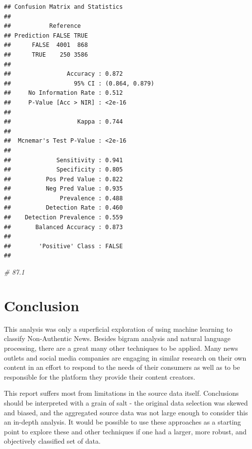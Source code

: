 \documentclass[
]{article}
\newenvironment{Shaded}{\begin{snugshade}}{\end{snugshade}}
\newcommand{\CommentTok}[1]{\textcolor[rgb]{0.56,0.35,0.01}{\textit{#1}}}
\begin{document}
\begin{verbatim}
## Confusion Matrix and Statistics
## 
##           Reference
## Prediction FALSE TRUE
##      FALSE  4001  868
##      TRUE    250 3586
##                                         
##                Accuracy : 0.872         
##                  95% CI : (0.864, 0.879)
##     No Information Rate : 0.512         
##     P-Value [Acc > NIR] : <2e-16        
##                                         
##                   Kappa : 0.744         
##                                         
##  Mcnemar's Test P-Value : <2e-16        
##                                         
##             Sensitivity : 0.941         
##             Specificity : 0.805         
##          Pos Pred Value : 0.822         
##          Neg Pred Value : 0.935         
##              Prevalence : 0.488         
##          Detection Rate : 0.460         
##    Detection Prevalence : 0.559         
##       Balanced Accuracy : 0.873         
##                                         
##        'Positive' Class : FALSE         
## 
\end{verbatim}

\begin{Shaded}
\begin{Highlighting}[]
\CommentTok{\#  87.1}
\end{Highlighting}
\end{Shaded}

\pagebreak

\hypertarget{conclusion}{%
\section{Conclusion}\label{conclusion}}

This analysis was only a superficial exploration of using machine
learning to classify Non-Authentic News. Besides bigram analysis and
natural language processing, there are a great many other techniques to
be applied. Many news outlets and social media companies are engaging in
similar research on their own content in an effort to respond to the
needs of their consumers as well as to be responsible for the platform
they provide their content creators.

This report suffers most from limitations in the source data itself.
Conclusions should be interpreted with a grain of salt - the original
data selection was skewed and biased, and the aggregated source data was
not large enough to consider this an in-depth analysis. It would be
possible to use these approaches as a starting point to explore these
and other techniques if one had a larger, more robust, and objectively
classified set of data.
\end{document}

